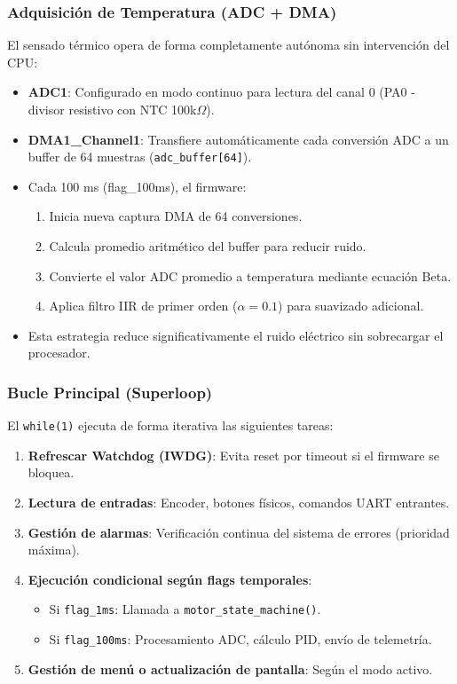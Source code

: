 \documentclass[12pt]{article}
\begin{document}
\subsubsection{Adquisición de Temperatura (ADC + DMA)}
El sensado térmico opera de forma completamente autónoma sin intervención del CPU:

\begin{itemize}
    \item \textbf{ADC1}: Configurado en modo continuo para lectura del canal 0 (PA0 - divisor resistivo con NTC 100k$\Omega$).
    \item \textbf{DMA1\_Channel1}: Transfiere automáticamente cada conversión ADC a un buffer de 64 muestras (\texttt{adc\_buffer[64]}).
    \item Cada 100 ms (flag\_100ms), el firmware:
    \begin{enumerate}
        \item Inicia nueva captura DMA de 64 conversiones.
        \item Calcula promedio aritmético del buffer para reducir ruido.
        \item Convierte el valor ADC promedio a temperatura mediante ecuación Beta.
        \item Aplica filtro IIR de primer orden ($\alpha = 0.1$) para suavizado adicional.
    \end{enumerate}
    \item Esta estrategia reduce significativamente el ruido eléctrico sin sobrecargar el procesador.
\end{itemize}

\subsubsection{Bucle Principal (Superloop)}
El \texttt{while(1)} ejecuta de forma iterativa las siguientes tareas:
\begin{enumerate}
    \item \textbf{Refrescar Watchdog (IWDG)}: Evita reset por timeout si el firmware se bloquea.
    \item \textbf{Lectura de entradas}: Encoder, botones físicos, comandos UART entrantes.
    \item \textbf{Gestión de alarmas}: Verificación continua del sistema de errores (prioridad máxima).
    \item \textbf{Ejecución condicional según flags temporales}:
    \begin{itemize}
        \item Si \texttt{flag\_1ms}: Llamada a \texttt{motor\_state\_machine()}.
        \item Si \texttt{flag\_100ms}: Procesamiento ADC, cálculo PID, envío de telemetría.
    \end{itemize}
    \item \textbf{Gestión de menú o actualización de pantalla}: Según el modo activo.
\end{enumerate}
\end{document}
